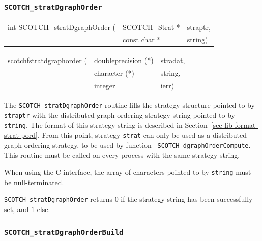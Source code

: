 \subsubsection{{\tt SCOTCH\_stratDgraphOrder}}

\begin{itemize}
\progsyn

{\tt\begin{tabular}{l@{}ll}
int SCOTCH\_stratDgraphOrder ( & SCOTCH\_Strat * & straptr, \\
                               & const char *    & string)
\end{tabular}}

{\tt\begin{tabular}{l@{}ll}
scotchfstratdgraphorder ( & doubleprecision (*) & stradat, \\
                          & character (*)       & string,  \\
                          & integer             & ierr)
\end{tabular}}

\progdes

The {\tt SCOTCH\_stratDgraphOrder} routine fills the strategy
structure pointed to by {\tt straptr} with the distributed graph
ordering strategy string pointed to by {\tt string}. The format of
this strategy string is described in Section~\ref{sec-lib-format-strat-pord}.
From this point, strategy {\tt strat} can only be used as a
distributed graph ordering strategy, to be used by function {\tt
SCOTCH\_\lbt dgraph\lbt Order\lbt Compute}. This routine must be
called on every process with the same strategy string.

When using the C interface, the array of characters pointed to by
{\tt string} must be null-terminated.

\progret

{\tt SCOTCH\_stratDgraphOrder} returns $0$ if the strategy string
has been successfully set, and $1$ else.
\end{itemize}

\subsubsection{{\tt SCOTCH\_stratDgraphOrderBuild}}

